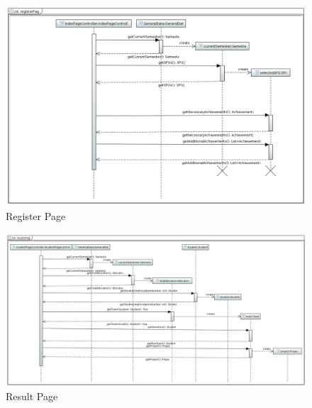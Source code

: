 \documentclass[parskip=full]{scrartcl}
\begin{document}
\begin{figure}
\centering
\includegraphics[width=\linewidth]{bilder/seqregisterPage.png}
\caption{Register Page}
\label{seq:registerPage}
\end{figure}

\begin{figure}
\centering
\includegraphics[width=\linewidth]{bilder/seqResultPage.png}
\caption{Result Page}
\label{seq:resultPage}
\end{figure}
\end{document}
